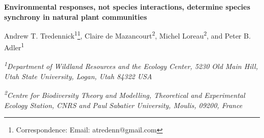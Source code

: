 \documentclass[12pt,]{article}
\title{}
\author{}
\date{}
\let\rmarkdownfootnote\footnote%
\def\footnote{\protect\rmarkdownfootnote}
\begin{document}
\maketitle

\thispagestyle{fancy}
\begin{singlespace}

\begin{center}
\large{\textbf{Environmental responses, not species interactions, determine species synchrony in natural plant communities}}

\renewcommand*{\thefootnote}{\fnsymbol{footnote}}

\vspace{1em}

\normalsize{Andrew T. Tredennick\textsuperscript{1}\footnote{Correspondence: Email: atredenn@gmail.com}, Claire de Mazancourt\textsuperscript{2}, Michel Loreau\textsuperscript{2}, and Peter B. Adler\textsuperscript{1}}

\vspace{1em}

\textit{\small{\textsuperscript{1}Department of Wildland Resources and the Ecology Center, 5230 Old Main Hill, Utah State University, Logan, Utah 84322 USA}}

\textit{\small{\textsuperscript{2}Centre for Biodiversity Theory and Modelling, Theoretical and Experimental Ecology Station, CNRS and Paul Sabatier University, Moulis, 09200, France}}

\end{center}

\end{singlespace}\renewcommand*{\thefootnote}{\arabic{footnote}}

\setcounter{footnote}{0}
\end{document}
